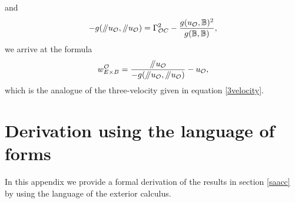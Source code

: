 \documentclass[usenatbib%
]{mnras}
\newcommand{\paral}{\mathbin{ \, \!/\mkern-5mu/\!} \,}
\begin{document}
and
\begin{equation}
- g(\paral u_\mathcal{O},\paral u_\mathcal{O}) =  \Gamma_{\mathcal{O}C}^2 - \dfrac{g(u_\mathcal{O},\mathbb{B})^2}{g(\mathbb{B},\mathbb{B})},
\end{equation}
we arrive at the formula
\begin{equation}
w_{E\times B}^{\mathcal{O}} = \dfrac{\paral u_\mathcal{O}}{- g(\paral u_\mathcal{O},\paral u_\mathcal{O})} - u_\mathcal{O},
\end{equation}
which is the analogue of the three-velocity given in equation \eqref{3velocity}.


\section{Derivation using the language of forms}\label{deriv with forms}

In this appendix we provide a  formal derivation of the results in section \ref{saacc} by using the language of the exterior calculus.
\end{document}

